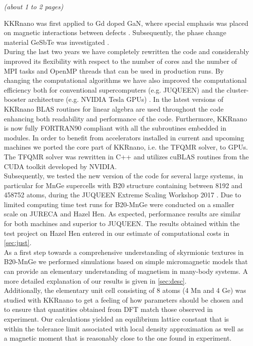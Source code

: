 \documentclass [a4paper, 12pt]{article}
\begin{document}
\textit{(about 1 to 2 pages)}

KKRnano was first applied to Gd doped GaN, where special emphasis was placed on
magnetic interactions between defects \cite{thiess_superparamagnetism_2012}. Subsequently,
the phase change material GeSbTe was investigated \cite{zhang_role_2012}.
\\
During the last two years we have completely rewritten the code and considerably improved 
its flexibility with respect to the number of cores and the number of MPI tasks and
OpenMP threads that can be used in production runs. By changing the computational algorithms
we have also improved the computational efficiency both for conventional
supercomputers (e.g. JUQUEEN) and the cluster-booster architecture
(e.g. NVIDIA Tesla GPUs) \cite{dutot_addressing_2016}.
In the latest versions of KKRnano BLAS routines for linear algebra are used throughout the code
enhancing both readability and performance of the code. Furthermore, KKRnano is now
fully FORTRAN90 compliant with all the subroutines embedded in modules.
In order to benefit from accelerators installed in current and upcoming machines we
ported the core part of KKRnano, i.e. the TFQMR solver, to GPUs. The TFQMR solver was rewritten
in C++ and utilizes cuBLAS routines from the CUDA toolkit developed by NVIDIA.
\\
Subsequently, we tested the new version of the code for several large systems, 
in particular for MnGe supercells with B20 structure containing between 8192 and 458752 atoms,
during the JUQUEEN Extreme Scaling Workshop 2017 \cite{brommel_juqueen_2017}.
Due to limited computing time test runs for B20-MnGe were conducted on a smaller scale on JURECA and Hazel Hen.
As expected, performance results are similar for both machines and superior to JUQUEEN.
The results obtained within the test project on Hazel Hen entered
in our estimate of computational costs in \cref{sec:just}.
\\
As a first step towards a comprehensive understanding of skyrmionic textures in B20-MnGe we
performed simulations based on simple micromagnetic models that can provide an elementary understanding
of magnetism in many-body systems. A more detailed explanation of our results is given in \cref{sec:desc}.
\\
Additionally, the elementary unit cell consisting of 8 atoms (4 Mn and 4 Ge) was
studied with KKRnano to get a feeling of how parameters should be chosen and
to ensure that quantities obtained from DFT
match those observed in experiment.
Our calculations yielded an equilibrium lattice constant that is within the tolerance limit
associated with local density approximation as well as a magnetic moment that is reasonably close to
the one
found in experiment.
\end{document}
